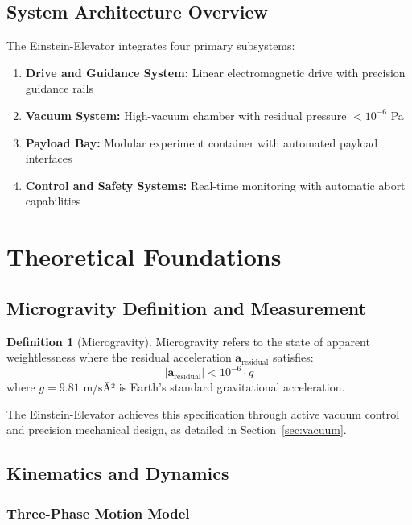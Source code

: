 ﻿\documentclass[a4paper,12pt]{article}
\theoremstyle{definition}
\newtheorem{definition}{Definition}
\begin{document}
\subsection{System Architecture Overview}

The Einstein-Elevator integrates four primary subsystems:

\begin{enumerate}
	\item \textbf{Drive and Guidance System:} Linear electromagnetic drive with precision guidance rails
	\item \textbf{Vacuum System:} High-vacuum chamber with residual pressure $< 10^{-6}$ Pa
	\item \textbf{Payload Bay:} Modular experiment container with automated payload interfaces
	\item \textbf{Control and Safety Systems:} Real-time monitoring with automatic abort capabilities
\end{enumerate}

\section{Theoretical Foundations}

\subsection{Microgravity Definition and Measurement}

\begin{definition}[Microgravity]
Microgravity refers to the state of apparent weightlessness where the residual acceleration $\mathbf{a}_{\text{residual}}$ satisfies:
\[
|\mathbf{a}_{\text{residual}}| < 10^{-6} \cdot g
\]
where $g = 9.81$ m/sÂ² is Earth's standard gravitational acceleration.
\end{definition}

The Einstein-Elevator achieves this specification through active vacuum control and precision mechanical design, as detailed in Section~\ref{sec:vacuum}.

\subsection{Kinematics and Dynamics}

\subsubsection{Three-Phase Motion Model}
\end{document}
